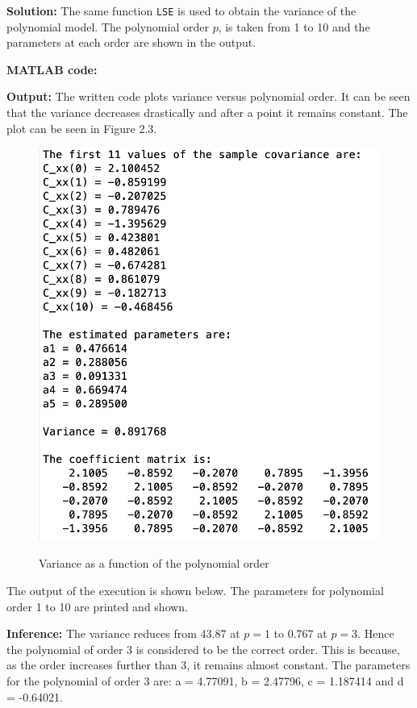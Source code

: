 \noindent \textbf{Solution:} The same function \texttt{LSE} is used to obtain the variance of the polynomial model. The polynomial order $p$, is taken from 1 to 10 and the parameters at each order are shown in the output. 

\noindent \textbf{MATLAB code:}

\noindent \textbf{Output:} The written code plots variance versus polynomial order. It can be seen that the  variance decreases drastically and after a point it remains constant. The plot can be seen in Figure 2.3.
\begin{figure}[H]
\centering
{\includegraphics[scale=0.16]{ass4_1.png}}
\caption{Variance as a function of the polynomial order}
\label{Variance as a function of the polynomial order}
\end{figure}
\newpage
\noindent The output of the execution is shown below. The parameters for polynomial order 1 to 10 are printed and shown.

\noindent \textbf{Inference:} The variance reduces from 43.87 at $p = 1$ to 0.767 at $p = 3.$ Hence the polynomial of order 3 is considered to be the correct order. This is because, as the order increases further than 3, it remains almost constant. The parameters for the polynomial of order 3 are:  a = 4.77091, b = 2.47796, c = 1.187414 and d = -0.64021.

